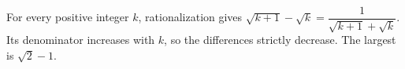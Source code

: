 For every positive integer $k$, rationalization gives $\sqrt{k+1}-\sqrt{k}=\dfrac{1}{\sqrt{k+1}+\sqrt{k}}$. Its denominator increases with $k$, so the differences strictly decrease. The largest is $\boxed{\sqrt2-1}$.

